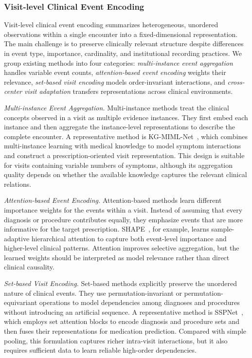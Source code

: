 \documentclass[manuscript,review]{acmart}
\begin{document}
\subsubsection{Visit-level Clinical Event Encoding}

Visit-level clinical event encoding summarizes heterogeneous, unordered observations within a single encounter into a fixed-dimensional representation. The main challenge is to preserve clinically relevant structure despite differences in event type, importance, cardinality, and institutional recording practices. We group existing methods into four categories: \textit{multi-instance event aggregation} handles variable event counts, \textit{attention-based event encoding} weights their relevance, \textit{set-based visit encoding} models order-invariant interactions, and \textit{cross-center visit adaptation} transfers representations across clinical environments.


\textit{Multi-instance Event Aggregation.} Multi-instance methods treat the clinical concepts observed in a visit as multiple evidence instances. They first embed each instance and then aggregate the instance-level representations to describe the complete encounter. A representative method is KG-MIML-Net~\cite{shangKnowledgeGuidedMultiinstance2018b}, which combines multi-instance learning with medical knowledge to model symptom interactions and construct a prescription-oriented visit representation. This design is suitable for visits containing variable numbers of symptoms, although its aggregation quality depends on whether the available knowledge captures the relevant clinical relations.

\textit{Attention-based Event Encoding.} Attention-based methods learn different importance weights for the events within a visit. Instead of assuming that every diagnosis or procedure contributes equally, they emphasize events that are more informative for the target prescription. SHAPE~\cite{liu2023shape}, for example, learns sample-adaptive hierarchical attention to capture both event-level importance and higher-level clinical patterns. Attention improves selective aggregation, but the learned weights should be interpreted as model relevance rather than direct clinical causality.

\textit{Set-based Visit Encoding.} Set-based methods explicitly preserve the unordered nature of clinical events. They use permutation-invariant or permutation-equivariant operations to model dependencies among diagnoses and procedures without introducing an artificial sequence. A representative method is SSPNet~\cite{zhang2025_sspnet}, which employs set attention blocks to encode diagnosis and procedure sets and then fuses their representations for medication prediction. Compared with simple pooling, this formulation captures richer intra-visit interactions, but it also requires sufficient data to learn reliable high-order dependencies.
\end{document}

